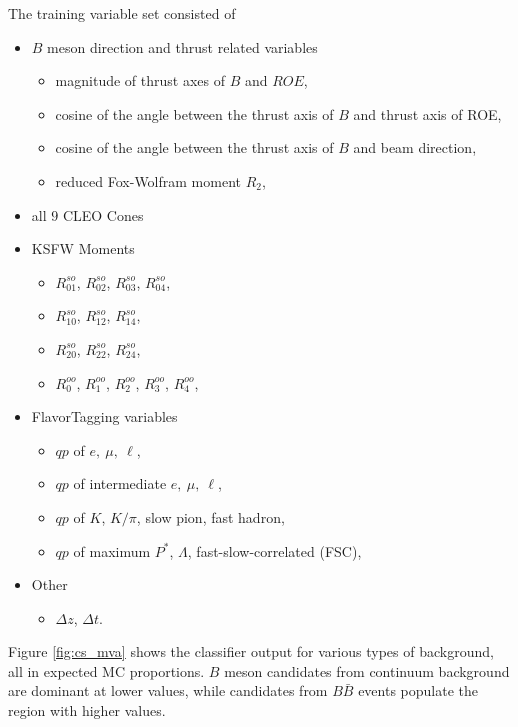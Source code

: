 The training variable set consisted of
\begin{itemize}
	\item $B$ meson direction and thrust related variables
	\begin{itemize}
		\item magnitude of thrust axes of $B$ and $ROE$,
		\item cosine of the angle between the thrust axis of $B$ and thrust axis of ROE,
		\item cosine of the angle between the thrust axis of $B$ and beam direction,
		\item reduced Fox-Wolfram moment $R_2 $,
	\end{itemize}
	\item all $9$ CLEO Cones
	\item KSFW Moments
	\begin{itemize}
		\item $R^{so}_{01}$, $R^{so}_{02}$, $R^{so}_{03}$, $R^{so}_{04}$,
		\item $R^{so}_{10}$, $R^{so}_{12}$, $R^{so}_{14}$,
		\item $R^{so}_{20}$, $R^{so}_{22}$, $R^{so}_{24}$,
		\item $R^{oo}_{0}$, $R^{oo}_{1}$, $R^{oo}_{2}$, $R^{oo}_{3}$, $R^{oo}_{4}$,
	\end{itemize}
	\item FlavorTagging variables
	\begin{itemize}
		\item $qp$ of $e,~\mu,~\ell$,
		\item $qp$ of intermediate $e,~\mu,~\ell$,
		\item $qp$ of $K$, $K/\pi$, slow pion, fast hadron,
		\item $qp$ of maximum $P^*$, $\Lambda$, fast-slow-correlated (FSC),
	\end{itemize}
	\item Other
	\begin{itemize}
		\item $\Delta z$, $\Delta t$.
	\end{itemize}
\end{itemize}

Figure \ref{fig:cs_mva} shows the classifier output for various types of background, all in expected MC proportions. $B$ meson candidates from continuum background are dominant at lower values, while candidates from $B \bar B$ events populate the region with higher values.

